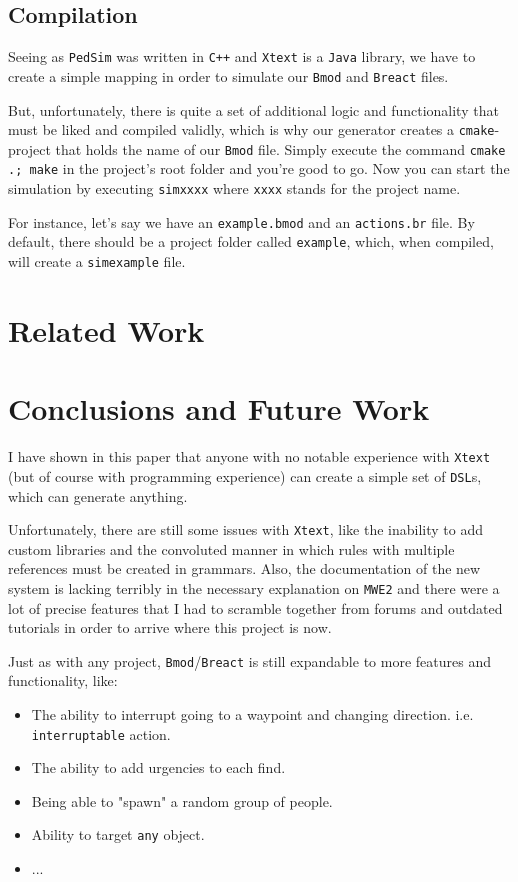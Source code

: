 \documentclass[review]{elsarticle}
\begin{document}
\subsection{Compilation}
Seeing as \texttt{PedSim} was written in \texttt{C++} and \texttt{Xtext} is a \texttt{Java} library, we have to create a simple mapping in order to simulate our \texttt{Bmod} and \texttt{Breact} files.

But, unfortunately, there is quite a set of additional logic and functionality that must be liked and compiled validly, which is why our generator creates a \texttt{cmake}-project that holds the name of our \texttt{Bmod} file. Simply execute the command \texttt{cmake .; make} in the project's root folder and you're good to go. Now you can start the simulation by executing \texttt{simxxxx} where \texttt{xxxx} stands for the project name.

For instance, let's say we have an \texttt{example.bmod} and an \texttt{actions.br} file. By default, there should be a project folder called \texttt{example}, which, when compiled, will create a \texttt{simexample} file.

\section{Related Work}
\section{Conclusions and Future Work}
I have shown in this paper that anyone with no notable experience with \texttt{Xtext} (but of course with programming experience) can create a simple set of \texttt{DSL}s, which can generate anything.

Unfortunately, there are still some issues with \texttt{Xtext}, like the inability to add custom libraries and the convoluted manner in which rules with multiple references must be created in grammars. Also, the documentation of the new system is lacking terribly in the necessary explanation on \texttt{MWE2} and there were a lot of precise features that I had to scramble together from forums and outdated tutorials in order to arrive where this project is now.

Just as with any project, \texttt{Bmod}/\texttt{Breact} is still expandable to more features and functionality, like:
\begin{itemize}
	\item The ability to interrupt going to a waypoint and changing direction. i.e. \texttt{interruptable} action.
	\item The ability to add urgencies to each find.
	\item Being able to "spawn" a random group of people.
	\item Ability to target \texttt{any} object.
	\item ...
\end{itemize}


\end{document}
